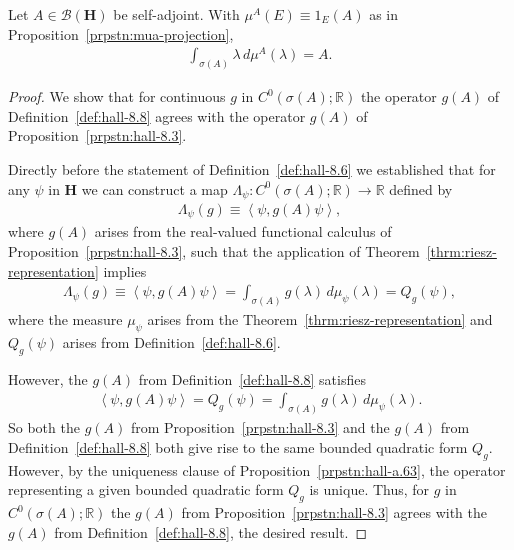 \begin{proposition}
    \label{prpstn:mua-integrates-to-A}
    \leanok
    Let $A \in \mathcal{B}(\mathbf{H})$ be self-adjoint. With $\mu^A(E) \equiv 1_E(A)$ as in Proposition~\ref{prpstn:mua-projection}, 
    \begin{align}
        \int_{\sigma(A)} \lambda \, d\mu^A(\lambda) = A.
    \end{align}
\end{proposition}
\begin{proof}
    \leanok
We show that for continuous $g$ in $C^0(\sigma(A); \mathbb{R})$ the operator $g(A)$ of Definition~\ref{def:hall-8.8} agrees with the operator $g(A)$ of Proposition~\ref{prpstn:hall-8.3}.

Directly before the statement of Definition~\ref{def:hall-8.6} we established that for any $\psi$ in $\mathbf{H}$ we can construct a map $\Lambda_\psi : C^0(\sigma(A); \mathbb{R}) \rightarrow \mathbb{R}$ defined by
\begin{align}
    \Lambda_\psi(g) \equiv \left< \psi, g(A)\psi \right>,
\end{align}
where $g(A)$ arises from the real-valued functional calculus of Proposition~\ref{prpstn:hall-8.3}, such that the application of Theorem~\ref{thrm:riesz-representation} implies
\begin{align}
    \Lambda_\psi(g) \equiv \left< \psi, g(A)\psi \right> = \int_{\sigma(A)} g(\lambda) \, d\mu_\psi(\lambda) = Q_g(\psi),
\end{align}
where the measure $\mu_\psi$ arises from the Theorem~\ref{thrm:riesz-representation} and $Q_g(\psi)$ arises from Definition~\ref{def:hall-8.6}.

However, the $g(A)$ from Definition~\ref{def:hall-8.8} satisfies
\begin{align}
    \left< \psi, g(A)\psi \right> = Q_g(\psi) = \int_{\sigma(A)} g(\lambda) \, d\mu_\psi(\lambda).
\end{align}
So both the $g(A)$ from Proposition~\ref{prpstn:hall-8.3} and the $g(A)$ from Definition~\ref{def:hall-8.8} both give rise to the same bounded quadratic form $Q_g$. However, by the uniqueness clause of Proposition~\ref{prpstn:hall-a.63}, the operator representing a given bounded quadratic form $Q_g$ is unique. Thus, for $g$ in $C^0(\sigma(A); \mathbb{R})$ the $g(A)$ from Proposition~\ref{prpstn:hall-8.3} agrees with the $g(A)$ from Definition~\ref{def:hall-8.8}, the desired result.


\end{proof}
